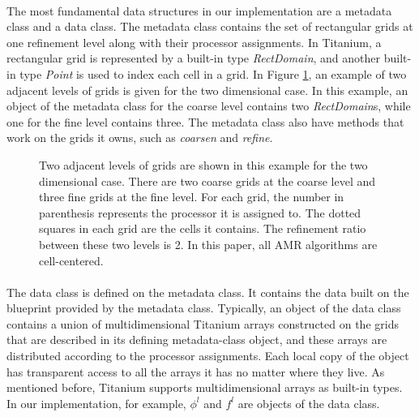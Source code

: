 \documentclass{ieee}
\numberwithin{equation}{section}
\begin{document}
\paragraph{}The most fundamental data structures in our implementation are a metadata class and a data class. The metadata class contains the set of rectangular grids at one refinement level along with their processor assignments. In Titanium, a rectangular grid is represented by a built-in type {\it RectDomain}, and another built-in type {\it Point} is used to index each cell in a grid. In Figure \ref{fig 1}, an example of two adjacent levels of grids is given for the two dimensional case. In this example, an object of the metadata class for the coarse level contains two {\it RectDomain}s, while one for the fine level contains three. The metadata class also have methods that work on the grids it owns, such as {\it coarsen} and {\it refine}.

\begin{figure}[h]
	\begin{center}
	\caption{Two adjacent levels of grids are shown in this example for the two dimensional case. There are two coarse grids at the coarse level and three fine grids at the fine level. For each grid, the number in parenthesis represents the processor it is assigned to. The dotted squares in each grid are the cells it contains. The refinement ratio between these two levels is 2. In this paper, all AMR algorithms are cell-centered.} \label{fig 1}
	\end{center}
\end{figure}

\paragraph{}The data class is defined on the metadata class. It contains the data built on the blueprint provided by the metadata class. Typically, an object of the data class contains a union of multidimensional Titanium arrays constructed on the grids that are described in its defining metadata-class object, and these  arrays are distributed according to the processor assignments. Each local copy of the object has transparent access to all the arrays it has no matter where they live. As mentioned before, Titanium supports multidimensional arrays as built-in types. In our implementation, for example, $\phi^l$ and $f^l$ are objects of the data class. 
\end{document}
